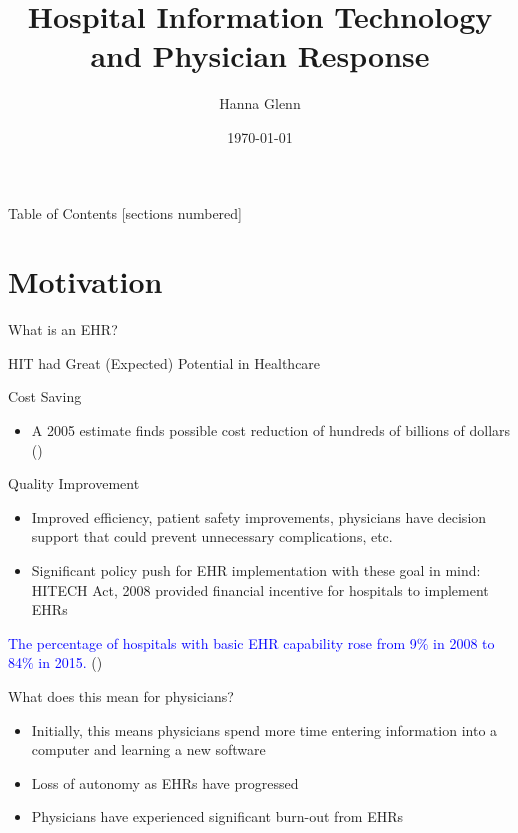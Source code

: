 \documentclass[10pt]{beamer}
\title{Hospital Information Technology and Physician Response}
\subtitle{Hanna Glenn}
\date{\today}
\begin{document}
\maketitle


\begin{frame}{Table of Contents}
  [sections numbered]
  \tableofcontents%
\end{frame}

\section[Motivation]{Motivation}

\begin{frame}{What is an EHR?}

\end{frame}

\begin{frame}[fragile]{HIT had Great (Expected) Potential in Healthcare}
\begin{alertblock}{Cost Saving}
\begin{itemize}
    \item A 2005 estimate finds possible cost reduction of hundreds of billions of dollars (\cite{hillestad2005})
\end{itemize}
\end{alertblock}

\begin{alertblock}{Quality Improvement}
\begin{itemize}
    \item Improved efficiency, patient safety improvements, physicians have decision support that could prevent unnecessary complications, etc.
    \item Significant policy push for EHR implementation with these goal in mind: HITECH Act, 2008 provided financial incentive for hospitals to implement EHRs \nocite{hitech}
\end{itemize}
\end{alertblock}

\textcolor{blue}{The percentage of hospitals with basic EHR capability rose from 9$\%$ in 2008 to 84$\%$ in 2015.} (\cite{stats})

\end{frame}

\begin{frame}[fragile]{What does this mean for physicians?}
\begin{itemize}
    \item Initially, this means physicians spend more time entering information into a computer and learning a new software
    \item Loss of autonomy as EHRs have progressed
    \item Physicians have experienced significant burn-out from EHRs
\end{itemize}

\end{frame}
\end{document}
